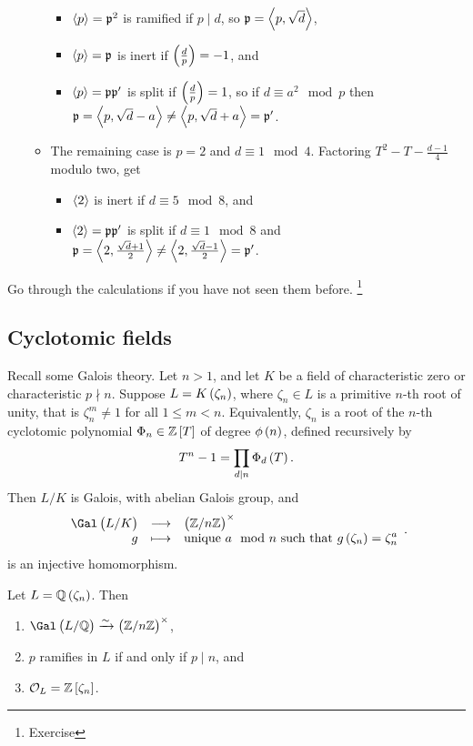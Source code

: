 \begin{itemize}
\begin{itemize}
\begin{itemize}
\item $ \left\langle p \right\rangle = \mathfrak{p}^2 $ is ramified if $ p \mid d $, so $ \mathfrak{p} = \left\langle p, \sqrt{d} \right\rangle $,
\item $ \left\langle p \right\rangle = \mathfrak{p} $ is inert if $ \br{\tfrac{d}{p}} = -1 $, and
\item $ \left\langle p \right\rangle = \mathfrak{p}\mathfrak{p}' $ is split if $ \br{\tfrac{d}{p}} = 1 $, so if $ d \equiv a^2 \mod p $ then $ \mathfrak{p} = \left\langle p, \sqrt{d} - a \right\rangle \ne \left\langle p, \sqrt{d} + a \right\rangle = \mathfrak{p}' $.
\end{itemize}
\item The remaining case is $ p = 2 $ and $ d \equiv 1 \mod 4 $. Factoring $ T^2 - T - \tfrac{d - 1}{4} $ modulo two, get
\begin{itemize}
\item $ \left\langle 2 \right\rangle $ is inert if $ d \equiv 5 \mod 8 $, and
\item $ \left\langle 2 \right\rangle = \mathfrak{p}\mathfrak{p}' $ is split if $ d \equiv 1 \mod 8 $ and $ \mathfrak{p} = \left\langle 2, \tfrac{\sqrt{d} + 1}{2} \right\rangle \ne \left\langle 2, \tfrac{\sqrt{d} - 1}{2} \right\rangle = \mathfrak{p}' $.
\end{itemize}
\end{itemize}
\end{itemize}
Go through the calculations if you have not seen them before. \footnote{Exercise}

\subsection{Cyclotomic fields}

Recall some Galois theory. Let $ n > 1 $, and let $ K $ be a field of characteristic zero or characteristic $ p \nmid n $. Suppose $ L = K\br{\zeta_n} $, where $ \zeta_n \in L $ is a primitive $ n $-th root of unity, that is $ \zeta_n^m \ne 1 $ for all $ 1 \le m < n $. Equivalently, $ \zeta_n $ is a root of the $ n $-th cyclotomic polynomial $ \Phi_n \in \ZZ\sbr{T} $ of degree $ \phi\br{n} $, defined recursively by
$$ T^n - 1 = \prod_{d \mid n} \Phi_d\br{T}. $$
Then $ L / K $ is Galois, with abelian Galois group, and
$$ \function{\Gal\br{L / K}}{\br{\ZZ / n\ZZ}^\times}{g}{\text{unique} \ a \mod n \ \text{such that} \ g\br{\zeta_n} = \zeta_n^a}. $$
is an injective homomorphism.

\pagebreak

\begin{theorem}
\label{thm:4.1}
Let $ L = \QQ\br{\zeta_n} $. Then
\begin{enumerate}
\item $ \Gal\br{L / \QQ} \xrightarrow{\sim} \br{\ZZ / n\ZZ}^\times $,
\item $ p $ ramifies in $ L $ if and only if $ p \mid n $, and
\item $ \OOO_L = \ZZ\sbr{\zeta_n} $.
\end{enumerate}
\end{theorem}

